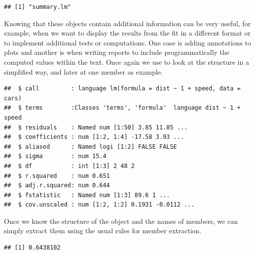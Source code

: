 \documentclass[krantz2]{krantz}\usepackage{knitr}
\begin{document}
\begin{explainbox}
\begin{knitrout}\footnotesize
{}\color{fgcolor}\begin{kframe}
\begin{alltt}
\hlstd{(}
\end{alltt}
\begin{verbatim}
## [1] "summary.lm"
\end{verbatim}
\end{kframe}
\end{knitrout}

Knowing that these objects contain additional information can be very useful, for example, when we want to display the results from the fit in a different format or to implement additional tests or computations. One case is adding annotations to plots and another is when writing reports to include programmatically the computed values within the text. Once again we use  to look at the structure in a simplified way, and later at one member as example.

\begin{knitrout}\footnotesize
{}\color{fgcolor}\begin{kframe}
\begin{alltt}
\hlstd{(}  \hlstd{=} \hlstd{,}  \hlstd{=} \hlstd{,}  \hlstd{=} \hlstd{)}
\end{alltt}
\begin{verbatim}
##  $ call         : language lm(formula = dist ~ 1 + speed, data = cars)
##  $ terms        :Classes 'terms', 'formula'  language dist ~ 1 + speed
##  $ residuals    : Named num [1:50] 3.85 11.85 ...
##  $ coefficients : num [1:2, 1:4] -17.58 3.93 ...
##  $ aliased      : Named logi [1:2] FALSE FALSE
##  $ sigma        : num 15.4
##  $ df           : int [1:3] 2 48 2
##  $ r.squared    : num 0.651
##  $ adj.r.squared: num 0.644
##  $ fstatistic   : Named num [1:3] 89.6 1 ...
##  $ cov.unscaled : num [1:2, 1:2] 0.1931 -0.0112 ...
\end{verbatim}
\end{kframe}
\end{knitrout}

Once we know the structure of the object and the names of members, we can simply extract them using the usual \Rlang rules for member extraction.

\begin{knitrout}\footnotesize
{}\color{fgcolor}\begin{kframe}
\begin{alltt}
\hlopt{$}
\end{alltt}
\begin{verbatim}
## [1] 0.6438102
\end{verbatim}
\end{kframe}
\end{knitrout}


\end{explainbox}
\end{document}
